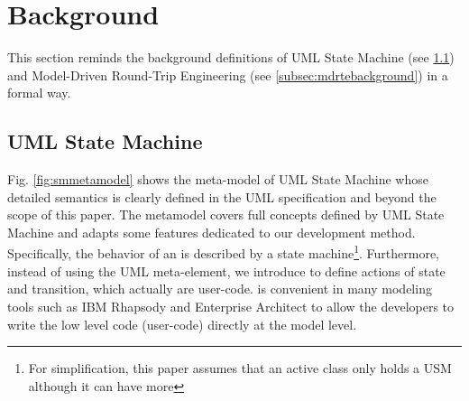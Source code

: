 \section{Background}
\label{sec:background}
This section reminds the background definitions of UML State Machine (see \ref{subsec:usmbackground}) and Model-Driven Round-Trip Engineering (see \ref{subsec:mdrtebackground}) in a formal way.


\subsection{UML State Machine}
\label{subsec:usmbackground}

 Fig. \ref{fig:smmetamodel} shows the meta-model of UML State Machine whose detailed semantics is clearly defined in the UML specification \cite{OMG2015} and beyond the scope of this paper.
The metamodel covers full concepts defined by UML State Machine and adapts some features dedicated to our development method.
Specifically, the behavior of an  is described by a state machine\footnote{%
	For simplification, this paper assumes that an active class only holds a USM although it can have more}.
Furthermore, instead of using the  UML meta-element, we introduce  to define actions of state and transition, which actually are user-code.
 is convenient in many modeling tools such as IBM Rhapsody and Enterprise Architect to allow the developers to write the low level code (user-code) directly at the model level.


